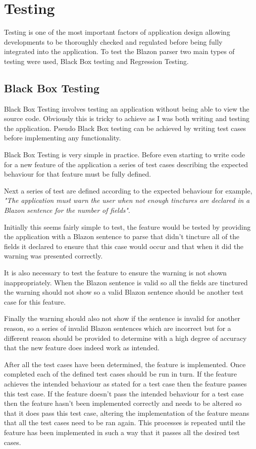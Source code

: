 \chapter{Testing}

Testing is one of the most important factors of application design allowing developments to be thoroughly checked and regulated before being fully integrated into the application.  To test the Blazon parser two main types of testing were used, Black Box testing and Regression Testing.

\section{Black Box Testing}

Black Box Testing involves testing an application without being able to view the source code.  Obviously this is tricky to achieve as I was both writing and testing the application.  Pseudo Black Box testing can be achieved by writing test cases before implementing any functionality. 

Black Box Testing is very simple in practice.  Before even starting to write code for a new feature of the application a series of test cases describing the expected behaviour for that feature must be fully defined. 

Next a series of test are defined according to the expected behaviour for example, \emph{"The application must warn the user when not enough tinctures are declared in a Blazon sentence for the number of fields"}.  

Initially this seems fairly simple to test, the feature would be tested by providing the application with a Blazon sentence to parse that didn't tincture all of the fields it declared to ensure that this case would occur and that when it did the warning was presented correctly.

It is also necessary to test the feature to ensure the warning is not shown inappropriately.  When the Blazon sentence is valid so all the fields are tinctured the warning should not show so a valid Blazon sentence should be another test case for this feature.

Finally the warning should also not show if the sentence is invalid for another reason, so a series of invalid Blazon sentences which are incorrect but for a different reason should be provided to determine with a high degree of accuracy that the new feature does indeed work as intended. 

After all the test cases have been determined, the feature is implemented.  Once completed each of the defined test cases should be run in turn.  If the feature achieves the intended behaviour as stated for a test case then the feature passes this test case.  If the feature doesn't pass the intended behaviour for a test case then the feature hasn't been implemented correctly and needs to be altered so that it does pass this test case, altering the implementation of the feature means that all the test cases need to be ran again.  This processes is repeated until the feature has been implemented in such a way that it passes all the desired test cases.



